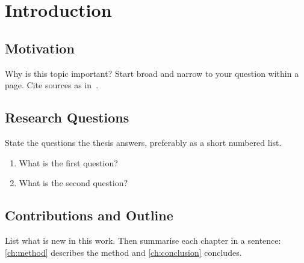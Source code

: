 \chapter{Introduction}\label{ch:intro}

\section{Motivation}
Why is this topic important? Start broad and narrow to your question within a page.
Cite sources as in~\cite{lamport94}.

\section{Research Questions}
State the questions the thesis answers, preferably as a short numbered list.
\begin{enumerate}
  \item What is the first question?
  \item What is the second question?
\end{enumerate}

\section{Contributions and Outline}
List what is new in this work. Then summarise each chapter in a sentence:
\cref{ch:method} describes the method and \cref{ch:conclusion} concludes.
